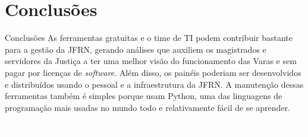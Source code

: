 \documentclass[10pt,t]{beamer}
\begin{document}
\section{Conclusões}

\begin{frame}{Conclusões}
	As ferramentas gratuitas e o time de TI podem contribuir bastante para a gestão da JFRN, gerando análises que auxiliem os magistrados e servidores da Justiça a ter uma melhor visão do funcionamento das Varas e sem pagar por licenças de \textit{software}. Além disso, os painéis poderiam ser desenvolvidos e distribuídos usando o pessoal e a infraestrutura da JFRN. A manutenção dessas ferramentas também é simples porque usam Python, uma das linguagens de programação mais usadas no mundo todo e relativamente fácil de se aprender.
\end{frame}

\begin{frame}[c,plain]{}
    \centering
    \textcolor{white}{Obrigado!}
\end{frame}
\end{document}
